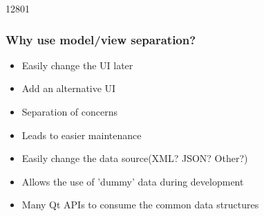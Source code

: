 \begin{slide}{12801}\frametitle{Why use model/view separation?}
\label{presenting-data-showcase}

\begin{itemize}
\item Easily change the UI later
\item Add an alternative UI
\item Separation of concerns
\item Leads to easier maintenance
\item Easily change the data source\linebreak(XML? JSON? Other?)
\item Allows the use of 'dummy' data during development
\item Many Qt APIs to consume the common data structures
\end{itemize}

\vspace*{2em}
\end{slide}






